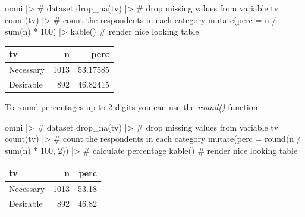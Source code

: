 \documentclass[
  letterpaper,
  DIV=11,
  numbers=noendperiod]{scrreprt}
\newenvironment{Shaded}{\begin{snugshade}}{\end{snugshade}}
\newcommand{\AttributeTok}[1]{\textcolor[rgb]{0.40,0.45,0.13}{#1}}
\newcommand{\CommentTok}[1]{\textcolor[rgb]{0.37,0.37,0.37}{#1}}
\newcommand{\DecValTok}[1]{\textcolor[rgb]{0.68,0.00,0.00}{#1}}
\newcommand{\FunctionTok}[1]{\textcolor[rgb]{0.28,0.35,0.67}{#1}}
\newcommand{\NormalTok}[1]{\textcolor[rgb]{0.00,0.23,0.31}{#1}}
\newcommand{\SpecialCharTok}[1]{\textcolor[rgb]{0.37,0.37,0.37}{#1}}
\newcounter{none} %
\begin{document}
\begin{Shaded}
\begin{Highlighting}[]
\NormalTok{omni }\SpecialCharTok{|\textgreater{}} \CommentTok{\# dataset}
  \FunctionTok{drop\_na}\NormalTok{(tv) }\SpecialCharTok{|\textgreater{}} \CommentTok{\# drop missing values from variable tv}
  \FunctionTok{count}\NormalTok{(tv) }\SpecialCharTok{|\textgreater{}} \CommentTok{\# count the respondents in each category}
  \FunctionTok{mutate}\NormalTok{(}\AttributeTok{perc =}\NormalTok{ n }\SpecialCharTok{/} \FunctionTok{sum}\NormalTok{(n) }\SpecialCharTok{*} \DecValTok{100}\NormalTok{) }\SpecialCharTok{|\textgreater{}} 
  \FunctionTok{kable}\NormalTok{() }\CommentTok{\# render nice looking table}
\end{Highlighting}
\end{Shaded}

{\def\LTcaptype{none} %
\begin{longtable}[]{@{}lrr@{}}
\toprule\noalign{}
tv & n & perc \\
\midrule\noalign{}
\endhead
\bottomrule\noalign{}
\endlastfoot
Necessary & 1013 & 53.17585 \\
Desirable & 892 & 46.82415 \\
\end{longtable}
}

To round percentages up to 2 digits you can use the \emph{round()}
function

\begin{Shaded}
\begin{Highlighting}[]
\NormalTok{omni }\SpecialCharTok{|\textgreater{}} \CommentTok{\# dataset}
  \FunctionTok{drop\_na}\NormalTok{(tv) }\SpecialCharTok{|\textgreater{}} \CommentTok{\# drop missing values from variable tv}
  \FunctionTok{count}\NormalTok{(tv) }\SpecialCharTok{|\textgreater{}} \CommentTok{\# count the respondents in each category}
  \FunctionTok{mutate}\NormalTok{(}\AttributeTok{perc =} \FunctionTok{round}\NormalTok{(n }\SpecialCharTok{/} \FunctionTok{sum}\NormalTok{(n) }\SpecialCharTok{*} \DecValTok{100}\NormalTok{, }\DecValTok{2}\NormalTok{)) }\SpecialCharTok{|\textgreater{}} \CommentTok{\# calculate percentage}
  \FunctionTok{kable}\NormalTok{() }\CommentTok{\# render nice looking table}
\end{Highlighting}
\end{Shaded}

{\def\LTcaptype{none} %
\begin{longtable}[]{@{}lrr@{}}
\toprule\noalign{}
tv & n & perc \\
\midrule\noalign{}
\endhead
\bottomrule\noalign{}
\endlastfoot
Necessary & 1013 & 53.18 \\
Desirable & 892 & 46.82 \\
\end{longtable}
}
\end{document}
